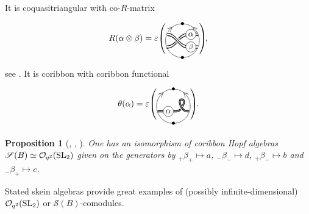 \documentclass[pdftex]{sigma}%
\numberwithin{equation}{section}
\newtheorem{Proposition}[Theorem]{Proposition}
 { \theoremstyle{definition}
\newtheorem{Definition}[Theorem]{Definition}
\newtheorem{Note}[Theorem]{Note}
\newtheorem{Example}[Theorem]{Example}
\newtheorem{Remark}[Theorem]{Remark} }
\newcommand{\Oq}{\mathcal{O}_{q^2}({\rm SL}_2)}
\begin{document}
\begin{Example}
\[ \]
It is coquasitriangular with co-$R$-matrix
\[
R(\alpha \otimes \beta) =\varepsilon
\raisebox{0pt}{$\left(\rule{-3pt}{22pt}\right.$}\!
\begin{tikzpicture}[scale = 0.7, baseline = 0pt, rotate = 180]
\draw (0,-1) node{\small $\bullet$} arc(-90:90:1) node[near start, sloped]{\small $>$} node{\small $\bullet$};
\draw (0,-1) arc(-90:-270:1) node[near start, sloped]{\small $<$};
\draw[thick] (-0.9,-0.45) -- (-0.4,-0.45) .. controls (0.3,-0.45) and (0.3,0.3).. (0.9,0.3);
\draw[thick] (-0.94,-0.3) -- (-0.4,-0.3) .. controls (0.3,-0.3) and (0.3,0.45).. (0.94,0.45);
\draw[line width = 3pt, white] (-0.94,0.3) -- (-0.4,0.3) .. controls (0.3,0.3) and (0.3,-0.45).. (0.94,-0.45);
\draw[thick] (-0.94,0.3) -- (-0.4,0.3) .. controls (0.3,0.3) and (0.3,-0.45).. (0.94,-0.45);
\draw[line width = 3pt, white] (-0.9,0.45) -- (-0.4,0.45) .. controls (0.3,0.45) and (0.3,-0.3).. (0.9,-0.3);
\draw[thick] (-0.9,0.45) -- (-0.4,0.45) .. controls (0.3,0.45) and (0.3,-0.3).. (0.9,-0.3);
\node[circle, fill=white, draw = black, scale = 0.8, inner sep = 1.5pt] (X) at (-0.5,0.37){$\beta$};
\node[circle, fill=white, draw = black, scale = 1, inner sep = 1.5pt] (X) at (-0.5,-0.37){$\alpha$};
\end{tikzpicture}\!
\raisebox{0pt}{$\left.\rule{-3pt}{22pt}\right)$}\!,
\]
see \cite[Theorem~3.5]{Cos}.
It is coribbon with coribbon functional
\[
\theta(\alpha) = \varepsilon
\raisebox{0pt}{$\left(\rule{-3pt}{22pt}\right.$}\!
\begin{tikzpicture}[scale = 0.7, baseline = 0pt]
\draw (0,-1) node{\small $\bullet$} arc(-90:90:1) node[near end, sloped]{\small $<$} node{\small $\bullet$};
\draw (0,-1) arc(-90:-270:1) node[near end, sloped]{\small $>$};
\node[circle, draw = black, scale = 1, inner sep = 1.5pt] (X) at (-0.3,-0.3){$\alpha$};
\draw[thick, double] (-0.94,-0.3) -- (X) -- (0.2,-0.3) .. controls (0.5,-0.3) and (0.8,0.4).. (0.5,0.4);
\draw[line width = 4pt, white] (0.5,0.4).. controls (0.2,0.4) and (0.5,-0.3) .. (0.8,-0.3) -- (0.94,-0.3);
\draw[thick, double] (0.5,0.4).. controls (0.2,0.4) and (0.5,-0.3) .. (0.8,-0.3) -- (0.94,-0.3);
\end{tikzpicture}\!
\raisebox{0pt}{$\left.\rule{-3pt}{22pt}\right)$}\!.
\]
\end{Example}

\begin{Proposition}[{\cite[Theorem~4.1]{TTQLe}, \cite[Section~2.2]{KorQue}}, {\cite[Theorem~3.4]{Cos}}]
One has an isomorphism of coribbon Hopf algebras $\mathscr{S}(B)\simeq \Oq$ given on the generators by $_+\beta_+\mapsto a$, ${}_-\beta_{-}\mapsto d$,  ${}_+\beta_{-}\mapsto b$ and ${}_-\beta_{+}\mapsto c$.
\end{Proposition}
Stated skein algebras provide great examples of (possibly infinite-dimensional) $\Oq$ or $\mathscr{S}(B)$-comodules.
\end{document}
